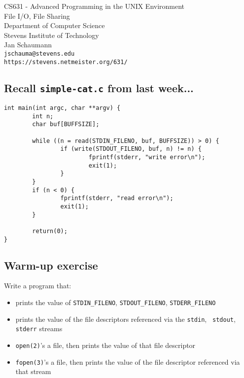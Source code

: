 \documentclass[xga]{xdvislides}
\begin{document}
\setfontphv

\lhead{\slidetitle}
\rhead{\relax}
\cfoot{\relax}
\rfoot{\Gray{\today}}

\vspace*{\fill}
\begin{center}
	\Hugesize
		CS631 - Advanced Programming in the UNIX Environment\\ [1em]
		File I/O, File Sharing
	\hspace*{5mm}\blueline\\ [1em]
	\Normalsize
		Department of Computer Science\\
		Stevens Institute of Technology\\
		Jan Schaumann\\
		\verb+jschauma@stevens.edu+\\
		\verb+https://stevens.netmeister.org/631/+
\end{center}
\vspace*{\fill}

\subsection{Recall {\tt simple-cat.c} from last week...}
\begin{verbatim}
int main(int argc, char **argv) {
        int n;
        char buf[BUFFSIZE];

        while ((n = read(STDIN_FILENO, buf, BUFFSIZE)) > 0) {
                if (write(STDOUT_FILENO, buf, n) != n) {
                        fprintf(stderr, "write error\n");
                        exit(1);
                }
        }
        if (n < 0) {
                fprintf(stderr, "read error\n");
                exit(1);
        }

        return(0);
}
\end{verbatim}

\subsection{Warm-up exercise}
Write a program that:
\begin{itemize}
	\item prints the value of {\tt STDIN\_FILENO},
		{\tt STDOUT\_FILENO}, {\tt STDERR\_FILENO}
	\item prints the value of the file descriptors
		referenced via the {\tt stdin}, {\tt
		stdout}, {\tt stderr} streams
	\item {\tt open(2)}'s a file, then prints the
		value of that file descriptor
	\item {\tt fopen(3)}'s a file, then prints
		the value of the file descriptor
		referenced via that stream
\end{itemize}
\end{document}

